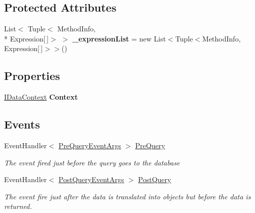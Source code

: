 \subsection*{Protected Attributes}
\begin{DoxyCompactItemize}
\item 
\hypertarget{class_highway_1_1_data_1_1_query_objects_1_1_query_base_a27dce07609e00f8553b79790cc8a9d1d}{List$<$ Tuple$<$ Method\-Info, \\*
Expression\mbox{[}$\,$\mbox{]}$>$ $>$ {\bfseries \-\_\-expression\-List} = new List$<$Tuple$<$Method\-Info, Expression\mbox{[}$\,$\mbox{]}$>$$>$()}\label{class_highway_1_1_data_1_1_query_objects_1_1_query_base_a27dce07609e00f8553b79790cc8a9d1d}

\end{DoxyCompactItemize}
\subsection*{Properties}
\begin{DoxyCompactItemize}
\item 
\hypertarget{class_highway_1_1_data_1_1_query_objects_1_1_query_base_aa8ca309734c39e9e78853e2a76c041f1}{\hyperlink{interface_highway_1_1_data_1_1_interfaces_1_1_i_data_context}{I\-Data\-Context} {\bfseries Context}}\label{class_highway_1_1_data_1_1_query_objects_1_1_query_base_aa8ca309734c39e9e78853e2a76c041f1}

\end{DoxyCompactItemize}
\subsection*{Events}
\begin{DoxyCompactItemize}
\item 
Event\-Handler$<$ \hyperlink{class_highway_1_1_data_1_1_interceptors_1_1_events_1_1_pre_query_event_args}{Pre\-Query\-Event\-Args} $>$ \hyperlink{class_highway_1_1_data_1_1_query_objects_1_1_query_base_a0f4a7c6fcd8e32c461633855ed00f824}{Pre\-Query}
\begin{DoxyCompactList}\small\item\em The event fired just before the query goes to the database \end{DoxyCompactList}\item 
Event\-Handler$<$ \hyperlink{class_highway_1_1_data_1_1_interceptors_1_1_events_1_1_post_query_event_args}{Post\-Query\-Event\-Args} $>$ \hyperlink{class_highway_1_1_data_1_1_query_objects_1_1_query_base_a75da4f1ac849eac015645365f982a9ff}{Post\-Query}
\begin{DoxyCompactList}\small\item\em The event fire just after the data is translated into objects but before the data is returned. \end{DoxyCompactList}\end{DoxyCompactItemize}


